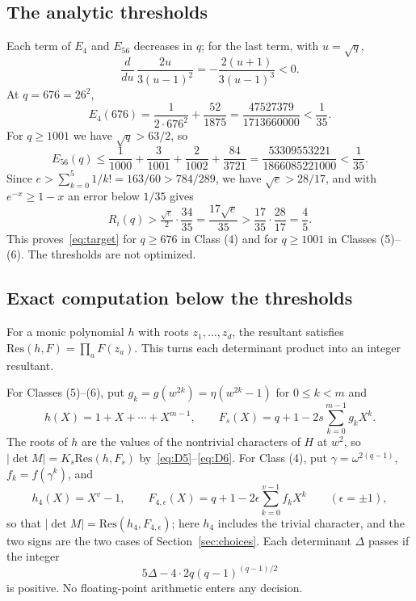 \documentclass[11pt]{article}
\newcommand{\Res}{\mathrm{Res}}
\newcommand{\abs}[1]{\lvert#1\rvert}
\newcommand{\Lstar}{\tfrac{\sqrt e}{2}}
\begin{document}
\subsection{The analytic thresholds}
Each term of $E_4$ and $E_{56}$ decreases in $q$; for the last term, with
$u=\sqrt q$,
\[
 \frac{d}{du}\,\frac{2u}{3(u-1)^2}=-\frac{2(u+1)}{3(u-1)^3}<0.
\]
At $q=676=26^2$,
\begin{equation}\label{eq:threshold4}
 E_4(676)=\frac1{2\cdot676^2}+\frac{52}{1875}
 =\frac{47527379}{1713660000}<\frac1{35}.
\end{equation}
For $q\ge1001$ we have $\sqrt q>63/2$, so
\begin{equation}\label{eq:threshold56}
 E_{56}(q)\le\frac1{1000}+\frac3{1001}+\frac2{1002}+\frac{84}{3721}
 =\frac{53309553221}{1866085221000}<\frac1{35}.
\end{equation}
Since $e>\sum_{k=0}^5 1/k!=163/60>784/289$, we have $\sqrt e>28/17$, and
with $e^{-x}\ge1-x$ an error below $1/35$ gives
\[
 R_i(q)>\Lstar\cdot\frac{34}{35}=\frac{17\sqrt e}{35}>\frac{17}{35}\cdot\frac{28}{17}=\frac45 .
\]
This proves~\eqref{eq:target} for $q\ge676$ in Class (4) and for
$q\ge1001$ in Classes (5)--(6). The thresholds are not optimized.

\subsection{Exact computation below the thresholds}
For a monic polynomial $h$ with roots $z_1,\ldots,z_d$, the resultant
satisfies $\Res(h,F)=\prod_a F(z_a)$. This turns each determinant product
into an integer resultant.

For Classes (5)--(6), put $g_k=g(w^{2k})=\eta(w^{2k}-1)$ for $0\le k<m$ and
\[
 h(X)=1+X+\cdots+X^{m-1},\qquad
 F_s(X)=q+1-2s\sum_{k=0}^{m-1}g_kX^k .
\]
The roots of $h$ are the values of the nontrivial characters of $H$ at
$w^2$, so $\abs{\det M}=K_s\Res(h,F_s)$ by~\eqref{eq:D5}--\eqref{eq:D6}.
For Class (4), put $\gamma=\omega^{2(q-1)}$, $f_k=f(\gamma^k)$, and
\[
 h_4(X)=X^v-1,\qquad
 F_{4,\epsilon}(X)=q+1-2\epsilon\sum_{k=0}^{v-1}f_kX^k\qquad(\epsilon=\pm1),
\]
so that $\abs{\det M}=\Res(h_4,F_{4,\epsilon})$; here $h_4$ includes the
trivial character, and the two signs are the two cases of
Section~\ref{sec:choices}. Each determinant $\Delta$ passes if the integer
\begin{equation}\label{eq:margin}
 5\Delta-4\cdot2q(q-1)^{(q-1)/2}
\end{equation}
is positive. No floating-point arithmetic enters any decision.
\end{document}
